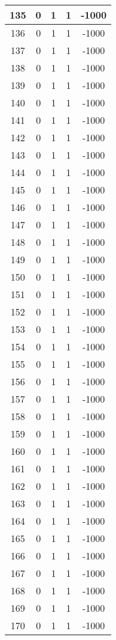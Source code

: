 \documentclass[letterpaper, 12pt]{article}
\begin{document}
\begin{longtable}{|c|c|c|c|c|}
\hline
135 & 0 & 1 & 1 & -1000 \\
\hline
136 & 0 & 1 & 1 & -1000 \\
\hline
137 & 0 & 1 & 1 & -1000 \\
\hline
138 & 0 & 1 & 1 & -1000 \\
\hline
139 & 0 & 1 & 1 & -1000 \\
\hline
140 & 0 & 1 & 1 & -1000 \\
\hline
141 & 0 & 1 & 1 & -1000 \\
\hline
142 & 0 & 1 & 1 & -1000 \\
\hline
143 & 0 & 1 & 1 & -1000 \\
\hline
144 & 0 & 1 & 1 & -1000 \\
\hline
145 & 0 & 1 & 1 & -1000 \\
\hline
146 & 0 & 1 & 1 & -1000 \\
\hline
147 & 0 & 1 & 1 & -1000 \\
\hline
148 & 0 & 1 & 1 & -1000 \\
\hline
149 & 0 & 1 & 1 & -1000 \\
\hline
150 & 0 & 1 & 1 & -1000 \\
\hline
151 & 0 & 1 & 1 & -1000 \\
\hline
152 & 0 & 1 & 1 & -1000 \\
\hline
153 & 0 & 1 & 1 & -1000 \\
\hline
154 & 0 & 1 & 1 & -1000 \\
\hline
155 & 0 & 1 & 1 & -1000 \\
\hline
156 & 0 & 1 & 1 & -1000 \\
\hline
157 & 0 & 1 & 1 & -1000 \\
\hline
158 & 0 & 1 & 1 & -1000 \\
\hline
159 & 0 & 1 & 1 & -1000 \\
\hline
160 & 0 & 1 & 1 & -1000 \\
\hline
161 & 0 & 1 & 1 & -1000 \\
\hline
162 & 0 & 1 & 1 & -1000 \\
\hline
163 & 0 & 1 & 1 & -1000 \\
\hline
164 & 0 & 1 & 1 & -1000 \\
\hline
165 & 0 & 1 & 1 & -1000 \\
\hline
166 & 0 & 1 & 1 & -1000 \\
\hline
167 & 0 & 1 & 1 & -1000 \\
\hline
168 & 0 & 1 & 1 & -1000 \\
\hline
169 & 0 & 1 & 1 & -1000 \\
\hline
170 & 0 & 1 & 1 & -1000 \\

\end{longtable}
\end{document}
